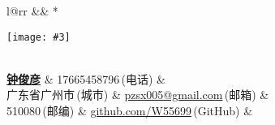 \newcommand{\paint}[3]{
    \begin{minipage}{#1}
        \texttt{[image: \#3]}
    \end{minipage}
}
\newcommand{\myheader}{
\begin{tabular*}{\textwidth}{l@{\extracolsep{\fill}}rr}
  && \multirow{4}*{\paint{2.6cm}{3.2cm}{./image.jpg}}\\
\textbf{\href{http://herechen.github.io}{\LARGE 钟俊彦}} & 17665458796$\,${\color{labelgrey}(电话)} &\\
 广东省广州市$\,${\color{labelgrey}(城市)} & \href{mailto:pzsx005@gmail.com}{pzsx005@gmail.com}$\,${\color{labelgrey}(邮箱)} & \\
  510080$\,${\color{labelgrey}(邮编)} & \href{https://github.com/W55699}{github.com/W55699}$\,${\color{labelgrey}(GitHub)} & \\
  \end{tabular*}\\\vspace{0.1in}
}

\myheader

